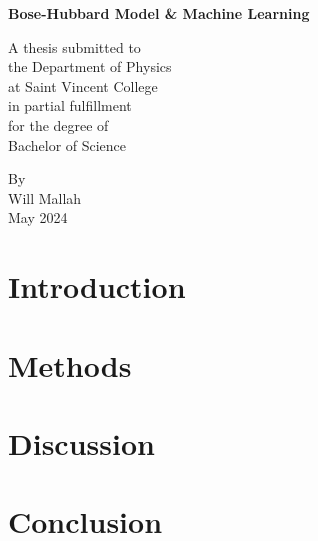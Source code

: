 \documentclass[longbibliography, 12pt]{article}
\begin{document}
	\begin{titlepage}
		\begin{center}
			\textbf{Bose-Hubbard Model \& Machine Learning}
			
			\vspace{5.5cm}
			A thesis submitted to\\ the Department of Physics\\ at Saint Vincent College\\ in partial fulfillment\\ for the degree of\\ Bachelor of Science
			
			\vspace{4.5cm}			
			By\\
			Will Mallah\\
			May 2024

		\end{center}
	\end{titlepage}

\newpage
\begin{abstract}

\end{abstract}

\newpage
\vspace*{-1mm}
\tableofcontents
\newpage
		
\section{Introduction}


\section{Methods} \label{methods}


\section{Discussion}


\section{Conclusion}


\newpage



\end{document}
